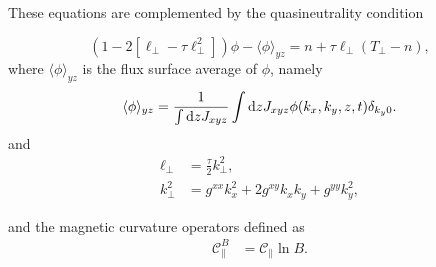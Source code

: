 \documentclass{article}
\begin{document}
These equations are complemented by the quasineutrality condition

\begin{equation}
\left(1 - 2\left[\ell_\perp - \tau\ell_\perp^2\right]\right)\phi - \langle\phi\rangle_{yz} = n + \tau\ell_\perp(T_\perp - n),
\end{equation}
where $\langle \phi \rangle_{yz}$ is the flux surface average of $\phi$, namely
\begin{equation}
    \langle \phi \rangle_{yz} = \frac{1}{\int\mathrm dz J_{xyz}}\int\mathrm dz J_{xyz}\phi(k_x,k_y,z,t)\delta_{k_y0}.
\end{equation}
and
\begin{align}
\ell_\perp &= \frac{\tau}{2} k_\perp^2,\\
k_\perp^2 &= g^{xx}k_x^2 + 2g^{xy}k_x k_y + g^{yy}k_y^2,
\end{align}

and the magnetic curvature operators defined as
\begin{align}
\mathcal{C}_\parallel^{B} &= \mathcal{C}_\parallel\ln B.
\end{align}
\end{document}
